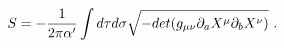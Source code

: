 \begin{equation}
S= -{1\over 2 \pi \alpha'}\int d\tau d\sigma 
\sqrt{-det(g_{\mu\nu}\partial_a X^\mu \partial_b X^\nu)}\label{acwila}\ .
\end{equation}

